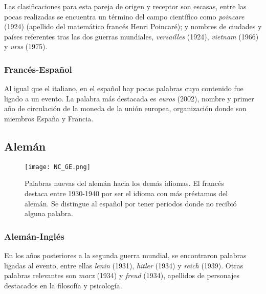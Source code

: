 Las clasificaciones para esta pareja de origen y receptor son escasas, entre las pocas realizadas se encuentra un término del campo científico como \textit{poincare} (1924) (apellido del matemático francés Henri Poincaré);  y nombres de ciudades y países referentes tras las dos guerras mundiales, \textit{versailles} (1924), \textit{vietnam} (1966)  y \textit{urss} (1975).


\subsubsection*{Francés-Español}%

Al igual que el italiano, en el español hay pocas palabras cuyo contenido fue ligado a un evento. La palabra más destacada es \textit{euros} (2002),
nombre y primer año de circulación de la moneda de la unión europea, organización donde son miembros España y Francia. 



\subsection{Alemán}%

\begin{figure}
	\centering
	\texttt{[image: NC\_GE.png]}
	\caption{Palabras nuevas del alemán hacia los demás idiomas. El francés destaca  entre 1930-1940 por ser el idioma con más préstamos del alemán. Se distingue al español por tener periodos donde no recibió alguna palabra.}  
	\label{fig.NC_GE}
\end{figure}




\subsubsection*{Alemán-Inglés}%

En los años posteriores a la segunda guerra mundial, se encontraron palabras ligadas al evento, entre ellas \textit{lenin} (1931), \textit{hitler} (1934) y \textit{reich} (1939).  Otras palabras relevantes son \textit{marx} (1934) y \textit{freud} (1934), apellidos de personajes destacados en la filosofía y psicología. 


